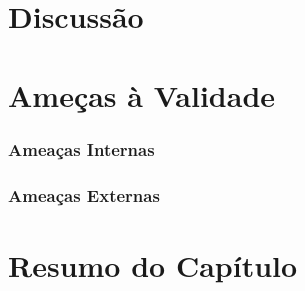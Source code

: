 \section{Discussão}

\section{Ameças à Validade}

\subsubsection{Ameaças Internas}
\label{ssub:Ameacas_internas}

\subsubsection{Ameaças Externas}
\label{ssub:Ameacas_externas}


\section{Resumo do Capítulo}
\label{sec:resumo_do_capitulo}
